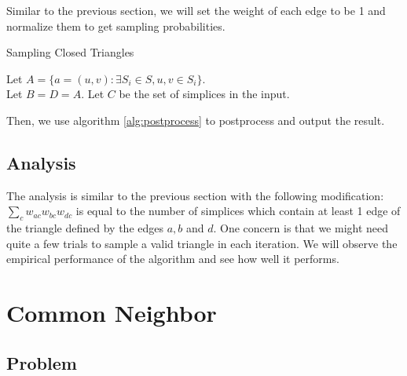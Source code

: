 \documentclass{article}
\begin{document}
Similar to the previous section, we will set the weight of each
edge to be 1 and normalize them to get sampling probabilities.

\begin{algorithm}\label{alg:allsampling}
  \caption{Sampling Closed Triangles}
  Let $A = \{a = (u,v) : \exists S_i \in S, u,v \in S_i \}$.\\
  Let $B = D = A$.
  Let $C$ be the set of simplices in the input.\\
\end{algorithm}

Then, we use algorithm \ref{alg:postprocess} to postprocess and output the result.


\subsection{Analysis}

The analysis is similar to the previous section with the following
modification: $\sum\limits_c w_{ac}w_{bc}w_{dc}$ is equal to the
number of simplices which contain at least 1 edge of the
triangle defined by the edges $a, b$ and $d$. One concern is that
we might need quite a few trials to sample a valid triangle in each
iteration. We will observe the empirical performance of the algorithm
and see how well it performs.


\section{Common  Neighbor}

\subsection{Problem}
\end{document}
